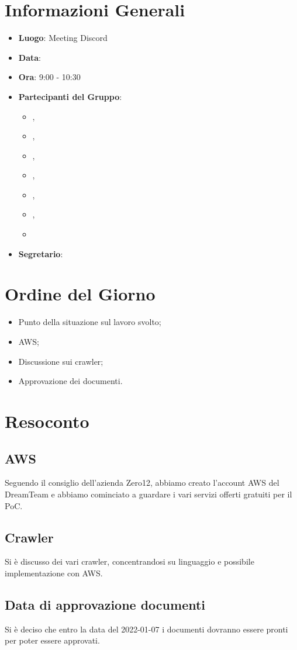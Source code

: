 \section{Informazioni Generali}

\begin{itemize}
\item{\textbf{Luogo}}: Meeting Discord
\item{\textbf{Data}}: \D{}
\item{\textbf{Ora}}: 9:00 - 10:30
\item{\textbf{Partecipanti del Gruppo}}: 
	\begin{itemize}
	\item{\EP{},} 
	\item{\FP{},}
	\item{\GC{},}
	\item{\LW{},}
	\item{\MB{},}
	\item{\MG{},}
	\item{\PV{}}
	\end{itemize} 
\item{\textbf{Segretario}}: \PV{}	
\end{itemize}

\section{Ordine del Giorno}
\begin{itemize}
\item{Punto della situazione sul lavoro svolto;}
\item{AWS;}
\item{Discussione sui crawler;}
\item{Approvazione dei documenti.}
\end{itemize}

\section{Resoconto}

\subsection{AWS}
Seguendo il consiglio dell'azienda Zero12, abbiamo creato l'account AWS del DreamTeam e abbiamo cominciato a guardare i vari servizi offerti gratuiti per il PoC.

\subsection{Crawler}
Si è discusso dei vari crawler, concentrandosi su linguaggio e possibile implementazione con AWS.

\subsection{Data di approvazione documenti}
Si è deciso che entro la data del 2022-01-07 i documenti dovranno essere pronti per poter essere approvati.
